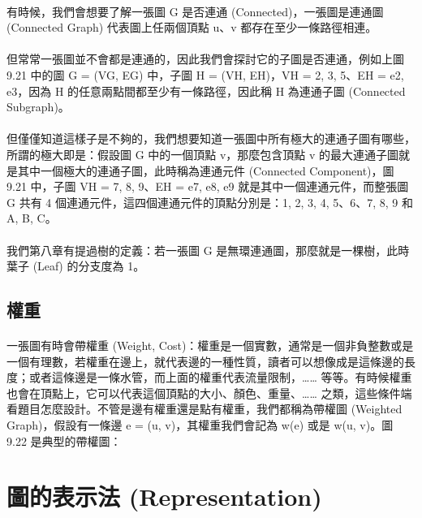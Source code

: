 \documentclass[12pt,a4paper,oneside]{report}
\begin{document}
\begin{CJK}{UTF8}{bkai}
\paragraph{}有時候，我們會想要了解一張圖 G 是否連通 (Connected)，一張圖是連通圖 (Connected Graph) 代表圖上任兩個頂點 u、v 都存在至少一條路徑相連。
\paragraph{}但常常一張圖並不會都是連通的，因此我們會探討它的子圖是否連通，例如上圖 9.21 中的圖 G = (VG, EG) 中，子圖 H = (VH, EH)，VH = {2, 3, 5}、EH = {e2, e3}，因為 H 的任意兩點間都至少有一條路徑，因此稱 H 為連通子圖 (Connected Subgraph)。
\paragraph{}但僅僅知道這樣子是不夠的，我們想要知道一張圖中所有極大的連通子圖有哪些，所謂的極大即是：假設圖 G 中的一個頂點 v，那麼包含頂點 v 的最大連通子圖就是其中一個極大的連通子圖，此時稱為連通元件 (Connected Component)，圖 9.21 中，子圖 VH = {7, 8, 9}、EH = {e7, e8, e9} 就是其中一個連通元件，而整張圖 G 共有 4 個連通元件，這四個連通元件的頂點分別是：{1, 2, 3, 4, 5}、{6}、{7, 8, 9} 和 {A, B, C}。
\paragraph{}我們第八章有提過樹的定義：若一張圖 G 是無環連通圖，那麼就是一棵樹，此時葉子 (Leaf) 的分支度為 1。

\subsection{權重}
\paragraph{}一張圖有時會帶權重 (Weight, Cost)：權重是一個實數，通常是一個非負整數或是一個有理數，若權重在邊上，就代表邊的一種性質，讀者可以想像成是這條邊的長度；或者這條邊是一條水管，而上面的權重代表流量限制，…… 等等。有時候權重也會在頂點上，它可以代表這個頂點的大小、顏色、重量、…… 之類，這些條件端看題目怎麼設計。不管是邊有權重還是點有權重，我們都稱為帶權圖 (Weighted Graph)，假設有一條邊 e = (u, v)，其權重我們會記為 w(e) 或是 w(u, v)。圖 9.22 是典型的帶權圖：

\section{圖的表示法 (Representation)}

\end{CJK}
\end{document}
